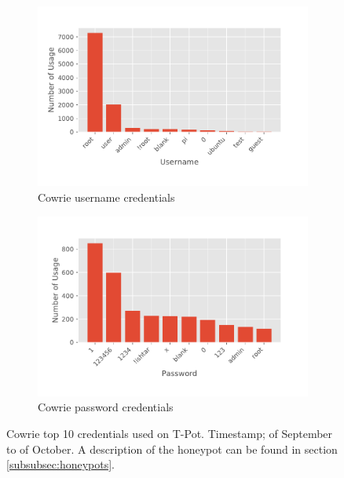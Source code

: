 \begin{figure}[htbp]
    \centering

    \begin{subfigure}[b]{0.49\textwidth}
        \centering
        \includegraphics[width=\textwidth]{figures/tpot-cowrie-username.pdf}
        \caption{Cowrie username credentials}
        \label{fig:tpot-cowrie-username}
    \end{subfigure}
    \hfill
    \begin{subfigure}[b]{0.49\textwidth}
        \centering
        \includegraphics[width=\textwidth]{figures/tpot-cowrie-password.pdf}
        \caption{Cowrie password credentials}
        \label{fig:tpot-cowrie-password}
    \end{subfigure}
    \caption[Cowrie top 10 credentials on T-Pot]{
        Cowrie top 10 credentials used on T-Pot.
        Timestamp;  of September to  of October.
        A description of the honeypot can be found in section \ref{subsubsec:honeypots}.
    }
    \label{fig:cowrie-credentials}
\end{figure}

